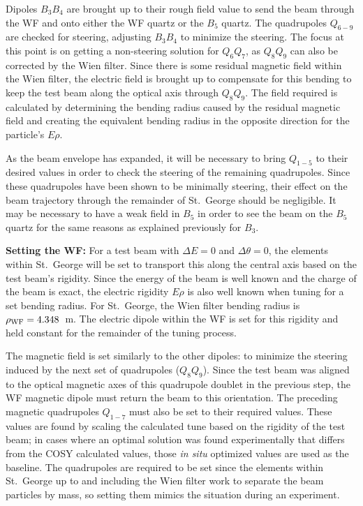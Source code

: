 Dipoles $B_3B_4$ are brought up to their rough field value to send the
beam through the WF and onto either the WF quartz or the $B_5$ quartz.
The quadrupoles $Q_{6-9}$ are checked for steering, adjusting $B_3B_4$
to minimize the steering. The focus at this point is on getting a
non-steering solution for $Q_6Q_7$, as $Q_8Q_9$ can also be corrected by
the Wien filter. Since there is some residual magnetic field within the
Wien filter, the electric field is brought up to compensate for this
bending to keep the test beam along the optical axis through $Q_8Q_9$.
The field required is calculated by determining the bending radius
caused by the residual magnetic field and creating the equivalent
bending radius in the opposite direction for the particle's $E\rho$.

As the beam envelope has expanded, it will be necessary to bring
$Q_{1-5}$ to their desired values in order to check the steering of the
remaining quadrupoles. Since these quadrupoles have been shown to be
minimally steering, their effect on the beam trajectory through the
remainder of St.\ George should be negligible. It may be necessary to
have a weak field in $B_5$ in order to see the beam on the $B_5$ quartz
for the same reasons as explained previously for $B_3$.

\textbf{Setting the WF:}
For a test beam with $\Delta E = 0$ and $\Delta\theta = 0$, the elements
within St.\ George will be set to transport this along the central axis
based on the test beam's rigidity. Since the energy of the beam is well
known and the charge of the beam is exact, the electric rigidity $E\rho$
is also well known when tuning for a set bending radius. For St.\
George, the Wien filter bending radius is $\rho_{\rm WF} = 4.348$~m. The
electric dipole within the WF is set for this rigidity and held constant
for the remainder of the tuning process.

The magnetic field is set similarly to the other dipoles: to minimize
the steering induced by the next set of quadrupoles ($Q_8Q_9$). Since
the test beam was aligned to the optical magnetic axes of this
quadrupole doublet in the previous step, the WF magnetic dipole must
return the beam to this orientation. The preceding magnetic quadrupoles
$Q_{1-7}$ must also be set to their required values. These values are
found by scaling the calculated tune based on the rigidity of the test
beam; in cases where an optimal solution was found experimentally that
differs from the COSY calculated values, those \emph{in situ} optimized
values are used as the baseline. The quadrupoles are required to be set
since the elements within St.\ George up to and including the Wien filter
work to separate the beam particles by mass, so setting them mimics the
situation during an experiment.

